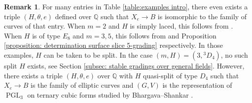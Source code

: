 \documentclass{article} %
\numberwithin{equation}{section}
\theoremstyle{definition}
\newtheorem{remark}[proposition]{Remark}
\DeclareMathOperator{\PGL}{PGL}
\newcommand{\Q}{\mathbb{Q}}
\begin{document}
\begin{remark}
    For many entries in Table \ref{table:examples intro}, there even exists a triple $(H, \theta, e)$ defined over $\Q$ such that $X_e\rightarrow B$ is isomorphic to the family of curves of that entry.
    When $m=2$ and $H$ is simply laced, this follows from \cite[Theorem 3.8]{Thorne-thesis}.
    When $H$ is of type $E_8$ and $m=3,5$, this follows from \cite[Proposition 4.12]{Thorne-Romano-E8} and Proposition \ref{proposition: determination surface slice 5-grading} respectively.
    In those examples, $H$ can be taken to be split.
    In the case $(m,H) = (3,{}^3D_4)$, no such split $H$ exists, see Section \ref{subsec: stable gradings over general fields}.
    However, there exists a triple $(H, \theta, e)$ over $\Q$ with $H$ quasi-split of type $D_4$ such that $X_e\rightarrow B$ is the family of elliptic curves and $(G,V)$ is the representation of $\PGL_3$ on ternary cubic forms studied by Bhargava--Shankar \cite{BS-3Selmer}.
\end{remark}
\end{document}
